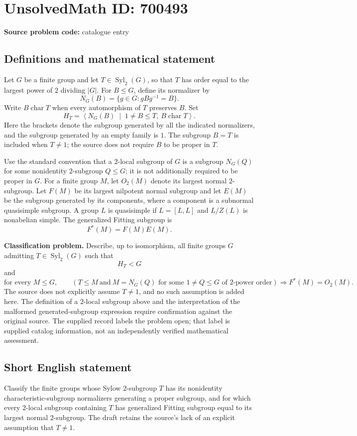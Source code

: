 \documentclass[11pt]{article}
\begin{document}
\section*{UnsolvedMath ID: 700493}
\textbf{Source problem code:} catalogue entry
\subsection{Definitions and mathematical statement}
Let \(G\) be a finite group and let \(T\in\operatorname{Syl}_2(G)\), so that \(T\) has order equal to the largest power of \(2\) dividing \(|G|\). For \(B\leq G\), define its normalizer by
\[
N_G(B)=\{g\in G:gBg^{-1}=B\}.
\]
Write \(B\operatorname{char}T\) when every automorphism of \(T\) preserves \(B\). Set
\[
H_T=\left\langle N_G(B)\;\middle|\;1\neq B\leq T,\ B\operatorname{char}T\right\rangle.
\]
Here the brackets denote the subgroup generated by all the indicated normalizers, and the subgroup generated by an empty family is \(1\). The subgroup \(B=T\) is included when \(T\neq1\); the source does not require \(B\) to be proper in \(T\).

Use the standard convention that a \(2\)-local subgroup of \(G\) is a subgroup \(N_G(Q)\) for some nonidentity \(2\)-subgroup \(Q\leq G\); it is not additionally required to be proper in \(G\). For a finite group \(M\), let \(O_2(M)\) denote its largest normal \(2\)-subgroup. Let \(F(M)\) be its largest nilpotent normal subgroup and let \(E(M)\) be the subgroup generated by its components, where a component is a subnormal quasisimple subgroup. A group \(L\) is quasisimple if \(L=[L,L]\) and \(L/Z(L)\) is nonabelian simple. The generalized Fitting subgroup is
\[
F^*(M)=F(M)E(M).
\]

\textbf{Classification problem.} Describe, up to isomorphism, all finite groups \(G\) admitting \(T\in\operatorname{Syl}_2(G)\) such that
\[
H_T<G
\]
and
\[
\text{for every }M\leq G,\qquad
\left(T\leq M\ \text{and}\ M=N_G(Q)\text{ for some }1\neq Q\leq G\text{ of }2\text{-power order}\right)
\Longrightarrow F^*(M)=O_2(M).
\]
The source does not explicitly assume \(T\neq1\), and no such assumption is added here. The definition of a \(2\)-local subgroup above and the interpretation of the malformed generated-subgroup expression require confirmation against the original source. The supplied record labels the problem open; that label is supplied catalog information, not an independently verified mathematical assessment.
\subsection{Short English statement}
Classify the finite groups whose Sylow \(2\)-subgroup \(T\) has its nonidentity characteristic-subgroup normalizers generating a proper subgroup, and for which every \(2\)-local subgroup containing \(T\) has generalized Fitting subgroup equal to its largest normal \(2\)-subgroup. The draft retains the source's lack of an explicit assumption that \(T\neq1\).
\end{document}
